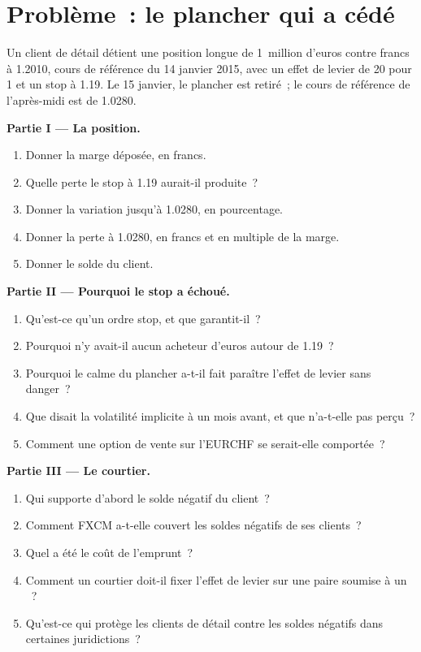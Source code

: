 \section{Problème~: le plancher qui a cédé}

\begin{problem}\label{pb:m2:emerging-market-fx-and-ndfs:1}
Un client de détail détient une position longue de 1~million d'euros contre francs à 1.2010, cours
de référence du 14 janvier 2015, avec un effet de levier de 20 pour 1 et un stop à 1.19. Le 15 janvier,
le plancher est retiré~; le cours de référence de l'après-midi est de 1.0280.

\medskip\noindent\textbf{Partie I --- La position.}
\begin{enumerate}
\item Donner la marge déposée, en francs.
\item Quelle perte le stop à 1.19 aurait-il produite~?
\item Donner la variation jusqu'à 1.0280, en pourcentage.
\item Donner la perte à 1.0280, en francs et en multiple de la marge.
\item Donner le solde du client.
\end{enumerate}

\medskip\noindent\textbf{Partie II --- Pourquoi le stop a échoué.}
\begin{enumerate}[resume]
\item Qu'est-ce qu'un ordre stop, et que garantit-il~?
\item Pourquoi n'y avait-il aucun acheteur d'euros autour de 1.19~?
\item Pourquoi le calme du plancher a-t-il fait paraître l'effet de levier sans danger~?
\item Que disait la volatilité implicite à un mois avant, et que n'a-t-elle pas perçu~?
\item Comment une option de vente sur l'EURCHF se serait-elle comportée~?
\end{enumerate}

\medskip\noindent\textbf{Partie III --- Le courtier.}
\begin{enumerate}[resume]
\item Qui supporte d'abord le solde négatif du client~?
\item Comment FXCM a-t-elle couvert les soldes négatifs de ses clients~?
\item Quel a été le coût de l'emprunt~?
\item Comment un courtier doit-il fixer l'effet de levier sur une paire soumise à un ~?
\item Qu'est-ce qui protège les clients de détail contre les soldes négatifs dans certaines juridictions~?
\end{enumerate}


\end{problem}
